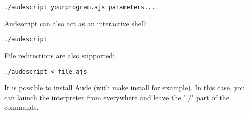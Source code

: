 \begin{verbatim}
./audescript yourprogram.ajs parameters...
\end{verbatim}

Audescript can also act as an interactive shell:

\begin{verbatim}
./audescript
\end{verbatim}

File redirections are also supported:

\begin{verbatim}
./audescript < file.ajs
\end{verbatim}

It is possible to install Aude (with make install for example). In this case, you can launch the interpreter from everywhere and leave the "./" part of the commands.

